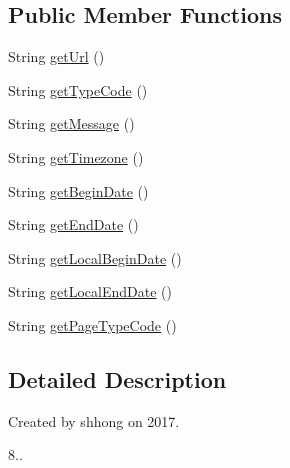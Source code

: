 \subsection*{Public Member Functions}
\begin{DoxyCompactItemize}
\item 
String \hyperlink{classcom_1_1toast_1_1android_1_1gamebase_1_1launching_1_1data_1_1_launching_maintenance_info_ad2ea28664c7db5089385e62816477d28}{get\+Url} ()
\item 
String \hyperlink{classcom_1_1toast_1_1android_1_1gamebase_1_1launching_1_1data_1_1_launching_maintenance_info_ac19e869ea7bb3cac88894ee3b805db79}{get\+Type\+Code} ()
\item 
String \hyperlink{classcom_1_1toast_1_1android_1_1gamebase_1_1launching_1_1data_1_1_launching_maintenance_info_afafd068b736520af1e24269a284980a9}{get\+Message} ()
\item 
String \hyperlink{classcom_1_1toast_1_1android_1_1gamebase_1_1launching_1_1data_1_1_launching_maintenance_info_aa33855f8c09210d287f7be5606a77e87}{get\+Timezone} ()
\item 
String \hyperlink{classcom_1_1toast_1_1android_1_1gamebase_1_1launching_1_1data_1_1_launching_maintenance_info_a842dfe5c51315c0403eecf42c5061c90}{get\+Begin\+Date} ()
\item 
String \hyperlink{classcom_1_1toast_1_1android_1_1gamebase_1_1launching_1_1data_1_1_launching_maintenance_info_aab584c35eba513c525208208dd4c6c7f}{get\+End\+Date} ()
\item 
String \hyperlink{classcom_1_1toast_1_1android_1_1gamebase_1_1launching_1_1data_1_1_launching_maintenance_info_a65f17922d007018c8dadb1f1a43c2751}{get\+Local\+Begin\+Date} ()
\item 
String \hyperlink{classcom_1_1toast_1_1android_1_1gamebase_1_1launching_1_1data_1_1_launching_maintenance_info_adf60c9b7a66fef80f6020560f9acf94d}{get\+Local\+End\+Date} ()
\item 
String \hyperlink{classcom_1_1toast_1_1android_1_1gamebase_1_1launching_1_1data_1_1_launching_maintenance_info_aa325f229a38ffe1161d3cbf7ed32e396}{get\+Page\+Type\+Code} ()
\end{DoxyCompactItemize}


\subsection{Detailed Description}
Created by shhong on 2017. 


\begin{DoxyEnumerate}
\item 8.. 
\end{DoxyEnumerate}

